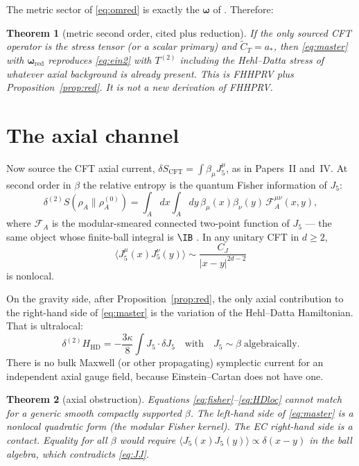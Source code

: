 \documentclass[11pt]{article}
\newtheorem{theorem}{Theorem}[section]
\theoremstyle{definition}
\begin{document}
The metric sector of \eqref{eq:omred} is exactly the $\boldsymbol{\omega}$ of
\cite{FHHPRV2017}. Therefore:

\begin{theorem}[metric second order, cited plus reduction]
\label{thm:metric}
If the only sourced CFT operator is the stress tensor (or a scalar
primary) and $\widetilde{C}_T=a_\ast$, then \eqref{eq:master} with
$\boldsymbol{\omega}_{\mathrm{red}}$ reproduces \eqref{eq:ein2} with
$T^{(2)}$ including the Hehl--Datta stress of whatever axial
background is already present. This is FHHPRV plus
Proposition~\ref{prop:red}. It is not a new derivation of FHHPRV.
\end{theorem}

\section{The axial channel}

Now source the CFT axial current, $\delta S_{\mathrm{CFT}}=\int\beta_\mu J_5^\mu$,
as in Papers~II and~IV. At second order in $\beta$ the relative entropy
is the quantum Fisher information of $J_5$:
\begin{equation}
\delta^{(2)}S(\rho_A\|\rho_A^{(0)})
=
\int_A\!dx\int_A\!dy\,
\beta_\mu(x)\beta_\nu(y)\,
\mathcal{F}_A^{\mu\nu}(x,y),
\label{eq:fisher}
\end{equation}
where $\mathcal{F}_A$ is the modular-smeared connected two-point
function of $J_5$ --- the same object whose finite-ball integral is
$\IB$ \cite{McGwierVI}. In any unitary CFT in $d\ge 2$,
\begin{equation}
\langle J_5^\mu(x)J_5^\nu(y)\rangle
\sim
\frac{C_J}{|x-y|^{2d-2}}
\label{eq:JJ}
\end{equation}
is nonlocal.

On the gravity side, after Proposition~\ref{prop:red}, the only
axial contribution to the right-hand side of \eqref{eq:master} is
the variation of the Hehl--Datta Hamiltonian. That is ultralocal:
\begin{equation}
\delta^{(2)}H_{\mathrm{HD}}
=
-\frac{3\kappa}{8}\int J_5\cdot\delta J_5
\quad\text{with}\quad
J_5\sim\beta
\;\text{algebraically}.
\label{eq:HDloc}
\end{equation}
There is no bulk Maxwell (or other propagating) symplectic current
for an independent axial gauge field, because Einstein--Cartan does
not have one.

\begin{theorem}[axial obstruction]
\label{thm:obs}
Equations \eqref{eq:fisher}--\eqref{eq:HDloc} cannot match for a
generic smooth compactly supported $\beta$. The left-hand side of
\eqref{eq:master} is a nonlocal quadratic form (the modular Fisher
kernel). The EC right-hand side is a contact. Equality for all
$\beta$ would require
$\langle J_5(x)J_5(y)\rangle\propto\delta(x-y)$ in the ball
algebra, which contradicts \eqref{eq:JJ}.
\end{theorem}
\end{document}
